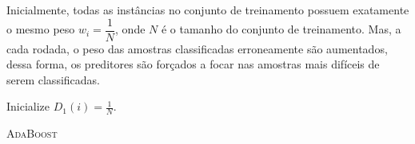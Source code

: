 Inicialmente, todas as instâncias no conjunto de treinamento possuem exatamente o mesmo peso $w_i = \dfrac{1}{N}$, onde $N$ é o tamanho do conjunto de treinamento. Mas, a cada rodada, o peso das amostras classificadas erroneamente são aumentados, dessa forma, os preditores são forçados a focar nas amostras mais difíceis de serem classificadas.


%
 \begin{algorithm}[H]
   \SetAlgoLined
   
   Inicialize $D_1(i) = \frac{1}{N}$.   
   
   
   \label{alg1}
   \caption{\textsc{AdaBoost}}
 \end{algorithm}
%
